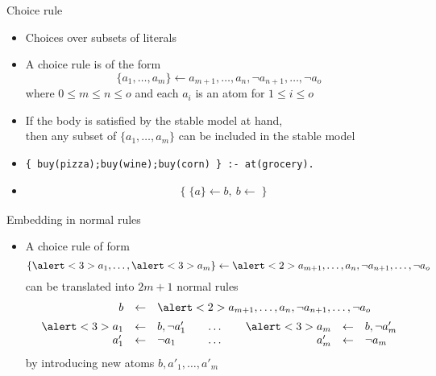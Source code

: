 \begin{frame}[fragile]{Choice rule}
  \label{eqn:choice:rule}
  \begin{itemize}
  \item {} Choices over subsets of literals
  \item {} A \alert{choice rule} is of the form
    \[
    \{a_1,\dots,a_m\}\leftarrow a_{m+1},\dots,a_n,\neg a_{n+1},\dots,\neg a_o
    \]
    where $0\leq m\leq n\leq o$ and each $a_i$ is an atom for $1\leq i\leq o$
    \smallskip
  \item<2->  If the body is satisfied by the stable model at hand,\\
    then any subset of $\{a_1,\dots,a_m\}$ can be included in the stable model
    \medskip
  \item<3->   %
\begin{lstlisting}[basicstyle=\ttfamily\small]
{ buy(pizza);buy(wine);buy(corn) } :- at(grocery).
\end{lstlisting}
  \item<4-> 
    \begin{align*}
      & \{\;\{a\}\leftarrow b,\ b\leftarrow\;\}
    \end{align*}
  \end{itemize}
\end{frame}
\begin{frame}{Embedding in normal rules}
  \begin{itemize}
  \item A choice rule of form
    \[
    \{\alert<3>{a_1},\dots,\alert<3>{a_m}\}\leftarrow \alert<2>{a_{m+1},\dots,a_n,\neg a_{n+1},\dots,\neg a_o}
    \]
    can be translated into $2m+1$ normal rules
    \[
    \begin{array}{rcl@{\qquad}c@{\qquad}rcl}
      b&\leftarrow&\multicolumn{5}{l}{\alert<2>{a_{m+1},\dots,a_n, \neg a_{n+1},\dots,\neg a_o}}
      \\[5pt]
      \alert<3>{a_1}&\leftarrow&b,\neg a'_1&\dots&\alert<3>{a_m}&\leftarrow&b,\neg a'_m\\
               a'_1 &\leftarrow&  \neg a_1 &\dots&         a'_m &\leftarrow&  \neg a_m
    \end{array}
    \]
    by introducing new atoms $b,a'_1,\dots,a'_m$
  \end{itemize}
\end{frame}
%
